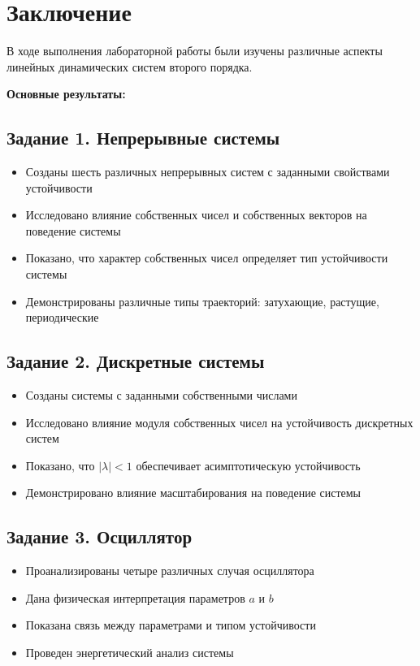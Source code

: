 \section*{Заключение}

В ходе выполнения лабораторной работы были изучены различные аспекты линейных динамических систем второго порядка.

\textbf{Основные результаты:}

\subsection*{Задание 1. Непрерывные системы}

\begin{itemize}
    \item Созданы шесть различных непрерывных систем с заданными свойствами устойчивости
    \item Исследовано влияние собственных чисел и собственных векторов на поведение системы
    \item Показано, что характер собственных чисел определяет тип устойчивости системы
    \item Демонстрированы различные типы траекторий: затухающие, растущие, периодические
\end{itemize}

\subsection*{Задание 2. Дискретные системы}

\begin{itemize}
    \item Созданы системы с заданными собственными числами
    \item Исследовано влияние модуля собственных чисел на устойчивость дискретных систем
    \item Показано, что $|\lambda| < 1$ обеспечивает асимптотическую устойчивость
    \item Демонстрировано влияние масштабирования на поведение системы
\end{itemize}

\subsection*{Задание 3. Осциллятор}

\begin{itemize}
    \item Проанализированы четыре различных случая осциллятора
    \item Дана физическая интерпретация параметров $a$ и $b$
    \item Показана связь между параметрами и типом устойчивости
    \item Проведен энергетический анализ системы
\end{itemize}

